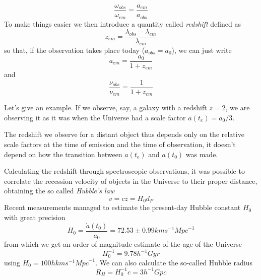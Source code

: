 \begin{equation*}
    \frac{\omega_{obs}}{\omega_{em}} = \frac{a_{em}}{a_{obs}}
\end{equation*}
To make things easier we then introduce a quantity called \emph{redshift} defined as 
\begin{equation}
    z_{em} = \frac{\lambda_{obs}-\lambda_{em}}{\lambda_{em}}
    \label{eq:redshift_def}
\end{equation}
so that, if the observation takes place today ($a_{obs} = a_{0}$), we can just write 
\begin{equation}
    \boxed{
    a_{em} = \frac{a_{0}}{1+z_{em}}
    }
    \label{eq:scalefactor_redshift}
\end{equation}
and 
\begin{equation}
    \boxed{
    \frac{\nu_{obs}}{\nu_{em}} = \frac{1}{1+z_{em}}
    }
    \label{eq:cosmological_redshift}
\end{equation}
\par Let's give an example. If we observe, say, a galaxy with a redshift $z = 2$, we are observing it as it was when the Universe had a scale factor $a(t_{e}) = a_{0}/3$.
\par The redshift we observe for a distant object thus depends only on the relative scale factors at the time of emission and the time of observation, it doesn't depend on how the transition between $a(t_{e})$ and $a(t_{0})$ was made.
\par Calculating the redshift through spectroscopic observations, it was possible to correlate the recession velocity of objects in the Universe to their proper distance, obtaining the so called \emph{Hubble's law}
\begin{equation}
    v = cz = H_{0}d_{P}
    \label{eq:hubblelaw}
\end{equation}
Recent measurements \cite{Riess_2022} managed to estimate the present-day Hubble constant $H_{0}$ with great precision
\begin{equation}
    H_{0} = \frac{\dot{a}(t_{0})}{a_{0}} = 72.53 \pm 0.99 \unit{km}\unit{s}^{-1}\unit{Mpc}^{-1}
    \label{eq:hubble_constant}
\end{equation}
from which we get an order-of-magnitude estimate of the age of the Universe
\begin{equation}
    H_{0}^{-1} = 9.78h^{-1}\unit{Gyr}
\end{equation}
using $H_{0} = 100h\unit{km}\unit{s}^{-1}\unit{Mpc}^{-1}$. We can also calculate the so-called Hubble radius
\begin{equation}
    R_{H} = H_{0}^{-1}c = 3h^{-1}\unit{Gpc}
\end{equation}
